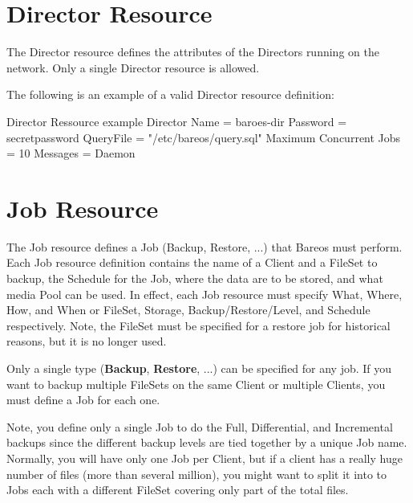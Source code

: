 \section{Director Resource}
\label{DirectorResourceDirector}

The Director resource defines the attributes of the Directors running on the
network. Only a single Director
resource is allowed.


The following is an example of a valid Director resource definition:

\begin{bconfig}{Director Ressource example}
Director {
  Name = baroes-dir
  Password = secretpassword
  QueryFile = "/etc/bareos/query.sql"
  Maximum Concurrent Jobs = 10
  Messages = Daemon
}
\end{bconfig}







\section{Job Resource}
\label{DirectorResourceJob}
\label{JobResource}

The Job resource defines a Job (Backup, Restore, ...) that Bareos must
perform. Each Job resource definition contains the name of a Client and
a FileSet to backup, the Schedule for the Job, where the data
are to be stored, and what media Pool can be used. In effect, each Job
resource must specify What, Where, How, and When or FileSet, Storage,
Backup/Restore/Level, and Schedule respectively. Note, the FileSet must
be specified for a restore job for historical reasons, but it is no longer used.

Only a single type ({\bf Backup}, {\bf Restore}, ...) can be specified for any
job. If you want to backup multiple FileSets on the same Client or multiple
Clients, you must define a Job for each one.

Note, you define only a single Job to do the Full, Differential, and
Incremental backups since the different backup levels are tied together by
a unique Job name.  Normally, you will have only one Job per Client, but
if a client has a really huge number of files (more than several million),
you might want to split it into to Jobs each with a different FileSet
covering only part of the total files.

